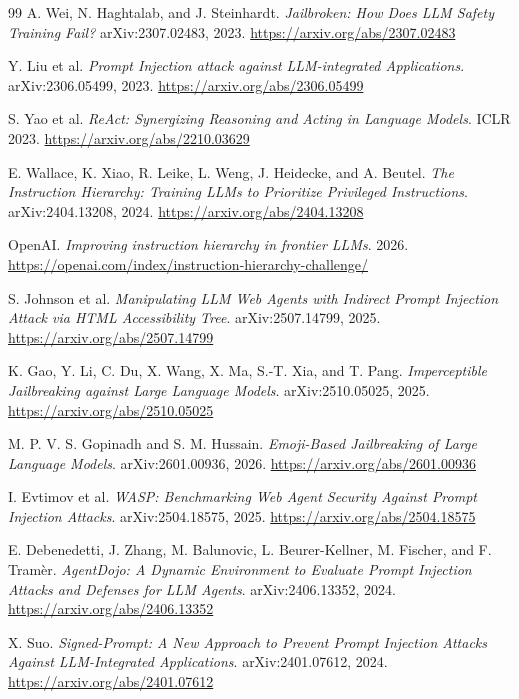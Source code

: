 \documentclass[11pt,a4paper]{report}
\begin{document}
\begin{thebibliography}{99}
A. Wei, N. Haghtalab, and J. Steinhardt.
\emph{Jailbroken: How Does LLM Safety Training Fail?}
arXiv:2307.02483, 2023.
\url{https://arxiv.org/abs/2307.02483}

Y. Liu et al.
\emph{Prompt Injection attack against LLM-integrated Applications}.
arXiv:2306.05499, 2023.
\url{https://arxiv.org/abs/2306.05499}

S. Yao et al.
\emph{ReAct: Synergizing Reasoning and Acting in Language Models}.
ICLR 2023.
\url{https://arxiv.org/abs/2210.03629}

E. Wallace, K. Xiao, R. Leike, L. Weng, J. Heidecke, and A. Beutel.
\emph{The Instruction Hierarchy: Training LLMs to Prioritize Privileged Instructions}.
arXiv:2404.13208, 2024.
\url{https://arxiv.org/abs/2404.13208}

OpenAI.
\emph{Improving instruction hierarchy in frontier LLMs}.
2026.
\url{https://openai.com/index/instruction-hierarchy-challenge/}

S. Johnson et al.
\emph{Manipulating LLM Web Agents with Indirect Prompt Injection Attack via HTML Accessibility Tree}.
arXiv:2507.14799, 2025.
\url{https://arxiv.org/abs/2507.14799}

K. Gao, Y. Li, C. Du, X. Wang, X. Ma, S.-T. Xia, and T. Pang.
\emph{Imperceptible Jailbreaking against Large Language Models}.
arXiv:2510.05025, 2025.
\url{https://arxiv.org/abs/2510.05025}

M. P. V. S. Gopinadh and S. M. Hussain.
\emph{Emoji-Based Jailbreaking of Large Language Models}.
arXiv:2601.00936, 2026.
\url{https://arxiv.org/abs/2601.00936}

I. Evtimov et al.
\emph{WASP: Benchmarking Web Agent Security Against Prompt Injection Attacks}.
arXiv:2504.18575, 2025.
\url{https://arxiv.org/abs/2504.18575}

E. Debenedetti, J. Zhang, M. Balunovic, L. Beurer-Kellner, M. Fischer, and F. Tram\`er.
\emph{AgentDojo: A Dynamic Environment to Evaluate Prompt Injection Attacks and Defenses for LLM Agents}.
arXiv:2406.13352, 2024.
\url{https://arxiv.org/abs/2406.13352}

X. Suo.
\emph{Signed-Prompt: A New Approach to Prevent Prompt Injection Attacks Against LLM-Integrated Applications}.
arXiv:2401.07612, 2024.
\url{https://arxiv.org/abs/2401.07612}


\end{thebibliography}
\end{document}
